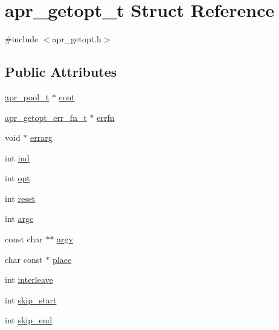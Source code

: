 \hypertarget{structapr__getopt__t}{}\section{apr\+\_\+getopt\+\_\+t Struct Reference}
\label{structapr__getopt__t}


{\ttfamily \#include $<$apr\+\_\+getopt.\+h$>$}

\subsection*{Public Attributes}
\begin{DoxyCompactItemize}
\item 
\mbox{\hyperlink{group__apr__pools_gaf137f28edcf9a086cd6bc36c20d7cdfb}{apr\+\_\+pool\+\_\+t}} $\ast$ \mbox{\hyperlink{structapr__getopt__t_a63a073fb9c11bb2713b3d7f967e95a24}{cont}}
\item 
\mbox{\hyperlink{group__apr__getopt_gad0f6c9baec81bc84293e0f1e2262656e}{apr\+\_\+getopt\+\_\+err\+\_\+fn\+\_\+t}} $\ast$ \mbox{\hyperlink{structapr__getopt__t_a6bf3fd7ad92d1f0161cd895e1ad50d06}{errfn}}
\item 
void $\ast$ \mbox{\hyperlink{structapr__getopt__t_a46db55c58789ab7fa99bb49544b0776e}{errarg}}
\item 
int \mbox{\hyperlink{structapr__getopt__t_ab04d49d670f095c3244dc9792b70ff07}{ind}}
\item 
int \mbox{\hyperlink{structapr__getopt__t_a4f842391b8f8f19e562584fdd29d0654}{opt}}
\item 
int \mbox{\hyperlink{structapr__getopt__t_abc4e72bc761666c0b0d9015c3b0de8c3}{reset}}
\item 
int \mbox{\hyperlink{structapr__getopt__t_a58aeb33137aabdd5a00efbde05652094}{argc}}
\item 
const char $\ast$$\ast$ \mbox{\hyperlink{structapr__getopt__t_a296c27d8db2fe6d4b88c5c7a85c40c02}{argv}}
\item 
char const  $\ast$ \mbox{\hyperlink{structapr__getopt__t_a87961387d1c71bebfbdf69c7f392d2d5}{place}}
\item 
int \mbox{\hyperlink{structapr__getopt__t_a771dbef87345c731845dd63723fb34db}{interleave}}
\item 
int \mbox{\hyperlink{structapr__getopt__t_a0cd41eedf9ed82bf5d9dcc3491ee67dd}{skip\+\_\+start}}
\item 
int \mbox{\hyperlink{structapr__getopt__t_ae9e7e6eb1576820c7dc6e589cc3a28b7}{skip\+\_\+end}}
\end{DoxyCompactItemize}


